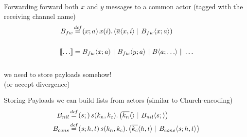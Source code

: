 \documentclass[]{beamer}
\begin{document}
    \begin{frame}{Forwarding}
      forward both $x$ and $y$ messages to a common actor (tagged with the receiving channel name)
      \begin{align*}
        \adef*{B_{fw}}{x}{a}{\arcv{x}{i} . \parens{\asnd{a}{x,i} \apar \ains{B_{fw}}{x}{a}}}
        \\\\
        \encMJtoAP{\ldots}
        &=    \ains{B_{fw}}{x}{a}
        \apar \ains{B_{fw}}{y}{a}
        \apar \ains{B}{a}{\ldots}
        \apar \ldots
      \end{align*}
      \\[1cm]
      \pause
      \center
      we need to store payloads somehow!\\
      (or accept divergence)
    \end{frame}

    \begin{frame}{Storing Payloads}
      we can build lists from actors (similar to Church-encoding)
      \begin{align*}
        \adef*{B_{nil}}{s}{}{\arcv{s}{k_n,k_c} . \parens{\asnd{k_n}{} \apar \ains{B_{nil}}{s}{}}}
        \\
        \adef*{B_{cons}}{s}{h,t}{\arcv{s}{k_n,k_c} . \parens{\asnd{k_c}{h,t} \apar \ains{B_{cons}}{s}{h,t}}}
      \end{align*}
    \end{frame}
\end{document}

